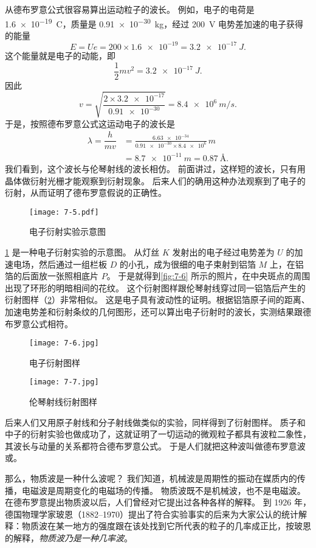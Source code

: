 从德布罗意公式很容易算出运动粒子的波长。
例如，电子的电荷是 \qty{1.6e-19}{C}，质量是 \qty{0.91e-30}{kg}，经过 \qty{200}{V} 电势差加速的电子获得的能量
\[E=Ue=200\times \num{1.6e-19}=\qty{3.2e-17}{J}.\]
这个能量就是电子的动能，即
\[\dfrac{1}{2}mv^2=\qty{3.2e-17}{J}.\]
因此
\[v=\sqrt{\frac{2\times \num{3.2e-17}}{\num{0.91e-30}}}=\qty{8.4e6}{m/s}.\]
于是，按照德布罗意公式这运动电子的波长是
\[\begin{split}
    \lambda=\dfrac{h}{mv}&=\frac{\num{6.63e-34}}{\num{0.91e-30}\times \num{8.4e6}}\,\unit{m} \\
&=\qty{8.7e-11}{m}=\qty{0.87}{\text{\AA}.}
\end{split}\]
我们看到，这个波长与伦琴射线的波长相仿。
前面讲过，这样短的波长，只有用晶体做衍射光栅才能观察到衍射现象。
后来人们的确用这种办法观察到了电子的衍射，从而证明了德布罗意假说的正确性。
\begin{figure}
  \texttt{[image: 7-5.pdf]}
  \caption{电子衍射实验示意图}\label{fig:7-5}
\end{figure}

\cref{fig:7-5} 是一种电子衍射实验的示意图。
从灯丝 $K$ 发射出的电子经过电势差为 $U$ 的加速电场，然后通过一组栏板 $D$ 的小孔，成为很细的电子束射到铝箔 $M$ 上，在铝箔的后面放一张照相底片 $P$。
于是就得到\cref{fig:7-6} 所示的照片，在中央斑点的周围出现了环形的明暗相间的花纹。
这个衍射图样跟伦琴射线穿过同一铝箔后产生的衍射图样（\cref{fig:7-7}）非常相似。
这是电子具有波动性的证明。根据铝箔原子间的距离、加速电势差和衍射条纹的几何图形，还可以算出电子衍射时的波长，实测结果跟德布罗意公式相符。

\begin{figure}
  \begin{minipage}[b]{0.48\linewidth}
    \centering
    \texttt{[image: 7-6.jpg]}
    \caption{电子衍射图样}\label{fig:7-6}
  \end{minipage}
  \begin{minipage}[b]{0.48\linewidth}
    \centering
    \texttt{[image: 7-7.jpg]}
    \caption{伦琴射线衍射图样}\label{fig:7-7}
  \end{minipage}
\end{figure}

后来人们又用原子射线和分子射线做类似的实验，同样得到了衍射图样。
质子和中子的衍射实验也做成功了，这就证明了一切运动的微观粒子都具有波粒二象性，其波长与动量的关系都符合德布罗意公式。
于是人们就把这种波叫做德布罗意波或。

那么，物质波是一种什么波呢？
我们知道，机械波是周期性的振动在媒质内的传播，电磁波是周期变化的电磁场的传播。
物质波既不是机械波，也不是电磁波。
在德布罗意提出物质波以后，人们曾经对它提出过各种各样的解释。
到 1926 年，德国物理学家玻恩（1882--1970）提出了符合实验事实的后来为大家公认的统计解释：物质波在某一地方的强度跟在该处找到它所代表的粒子的几率成正比，按玻恩的解释，\emph{物质波乃是一种几率波}。

